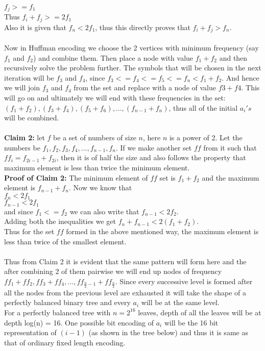 \documentclass{article}
\begin{document}
$f_j >= f_1$\\
Thus $f_i+f_j >= 2f_1$\\ 
Also it is given that $f_n < 2f_1$, thus this directly proves that $f_i+ f_j > f_n$.
\\\\
Now in Huffman encoding we choose the 2 vertices with minimum frequency (say $f_1$ and $f_2$) and combine them. Then place a node with value $f_1+f_2$ and then recursively solve the problem further. The symbols that will be chosen in the next iteration will be $f_3$ and $f_4$, since $f_3<=f_4<= f_5<= f_n < f_1+ f_2$. And hence we will join $f_3$ and $f_4$ from the set and replace with a node of value $f3+f4$. This will go on and ultimately we will end with these frequencies in the set: $(f_1+f_2), (f_3+f_4), (f_5+f_6), ... ,(f_{n-1}+f_n)$, thus all of the initial $a_i's$ will be combined.
\\\\
\textbf{Claim 2:} let $f$ be a set of numbers of size $n$, here $n$ is a power of 2. Let the numbers be $f_1, f_2, f_3, f_4, ... ,f_{n-1}, f_n$. If we make another set $ff$ from it such that ${ff}_i = f_{2i-1} + f_{2i}$, then it is of half the size and also follows the property that maximum element is less than twice the minimum element. 
\\
\textbf{Proof of Claim 2:} The minimum element of $ff$ set is $f_1+f_2$ and the maximum element is $f_{n-1}+f_n$. Now we know that\\ 
$f_n < 2f_1$\\
$f_{n-1} < 2f_1$\\
and since $f_1 <= f_2$ we can also write that $f_{n-1} < 2f_2$.\\
Adding both the inequalities we get $f_n + f_{n-1} < 2(f_1+ f_2)$.\\
Thus for the set $ff$ formed in the above mentioned way, the maximum element is less than twice of the smallest element. 
\\\\
Thus from Claim 2 it is evident that the same pattern will form here and the after combining 2 of them pairwise we will end up nodes of frequency $ff_1+ff_2, ff_3+ff_4, ... , ff_{\frac{n}{2}-1}+ff_{\frac{n}{2}}$. Since every successive level is formed after all the nodes from the previous level are exhausted it will take the shape of a perfectly balanced binary tree and every $a_i$ will be at the same level.
\\For a perfectly balanced tree with $n = 2^{16}$ leaves, depth of all the leaves will be at depth log(n) = 16. One possible bit encoding of $a_i$ will be the 16 bit representation of $(i-1)$ (as shown in the tree below) and thus it is same as that of ordinary fixed length encoding.
\end{document}
